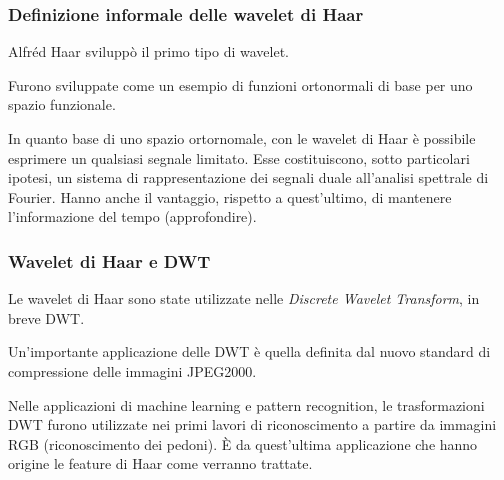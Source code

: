             \subsubsection{Definizione informale delle wavelet di Haar}
                Alfréd Haar sviluppò il primo tipo di wavelet.

                Furono sviluppate come un esempio di funzioni ortonormali di base per uno spazio funzionale.

                In quanto base di uno spazio ortornomale, con le wavelet di Haar è possibile esprimere un qualsiasi segnale limitato.
                Esse costituiscono, sotto particolari ipotesi, un sistema di rappresentazione dei segnali duale all'analisi spettrale di Fourier.
                Hanno anche il vantaggio, rispetto a quest'ultimo, di mantenere l'informazione del tempo (approfondire).

            \subsubsection{Wavelet di Haar e DWT}
                Le wavelet di Haar sono state utilizzate nelle \emph{Discrete Wavelet Transform}, in breve DWT.

                Un'importante applicazione delle DWT è quella definita dal nuovo standard di compressione delle immagini JPEG2000.

                Nelle applicazioni di machine learning e pattern recognition, le trasformazioni DWT furono utilizzate nei primi lavori di riconoscimento a partire da immagini RGB (riconoscimento dei pedoni).
                È da quest'ultima applicazione che hanno origine le feature di Haar come verranno trattate.

